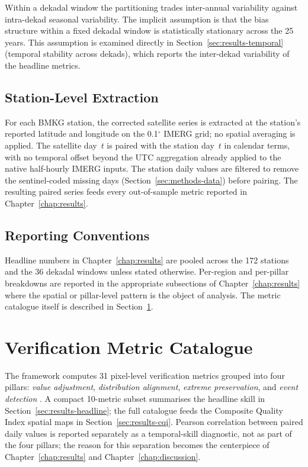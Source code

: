 Within a dekadal window the partitioning trades inter-annual
variability against intra-dekad seasonal variability. The
implicit assumption is that the bias structure within a fixed
dekadal window is statistically stationary across the 25 years.
This assumption is examined directly in
Section~\ref{sec:results-temporal} (temporal stability across
dekads), which reports the inter-dekad variability of the
headline metrics.

\subsection{Station-Level Extraction}

For each BMKG station, the corrected satellite series is
extracted at the station's reported latitude and longitude on
the 0.1$^{\circ}$ IMERG grid; no spatial averaging is applied.
The satellite day~$t$ is paired with the station day~$t$ in
calendar terms, with no temporal offset beyond the UTC
aggregation already applied to the native half-hourly IMERG
inputs. The station daily values are filtered to remove the
sentinel-coded missing days (Section~\ref{sec:methods-data})
before pairing. The resulting paired series feeds every
out-of-sample metric reported in Chapter~\ref{chap:results}.

\subsection{Reporting Conventions}

Headline numbers in Chapter~\ref{chap:results} are pooled
across the 172 stations and the 36 dekadal windows unless stated
otherwise. Per-region and per-pillar breakdowns are reported in
the appropriate subsections of Chapter~\ref{chap:results} where
the spatial or pillar-level pattern is the object of analysis.
The metric catalogue itself is described in
Section~\ref{sec:methods-metrics}.


\section{Verification Metric Catalogue}\label{sec:methods-metrics}

The framework computes 31 pixel-level verification metrics
grouped into four pillars: \textit{value adjustment},
\textit{distribution alignment}, \textit{extreme preservation},
and \textit{event detection} \citep{ref:ebert2007, ref:wilks2020}.
A compact 10-metric subset summarises the headline skill in
Section~\ref{sec:results-headline}; the full catalogue feeds the
Composite Quality Index spatial maps in
Section~\ref{sec:results-cqi}. Pearson correlation between paired
daily values is reported separately as a temporal-skill
diagnostic, not as part of the four pillars; the reason for this
separation becomes the centerpiece of Chapter~\ref{chap:results}
and Chapter~\ref{chap:discussion}.

